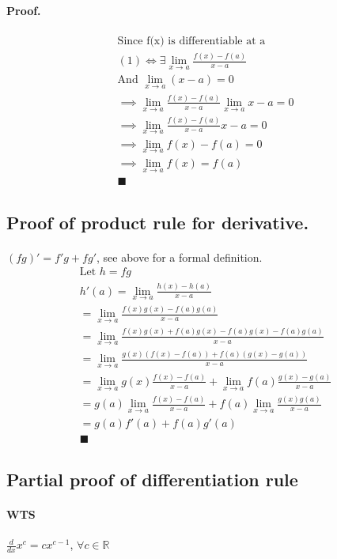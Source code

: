 \documentclass{article}
\begin{document}
	\paragraph{Proof.}
	\begin{align*}
		\text{Since f(x) is differentiable at a} \\
		(1) \iff \exists \lim_{x \to a}\frac{f(x) - f(a)}{x - a} \\
		\text{And } \lim_{x \to a}({x - a}) = 0\\
		\implies \lim_{x \to a}\frac{f(x) - f(a)}{x - a} \lim_{x \to a}{x - a} = 0 \\
		\implies \lim_{x \to a}{\frac{f(x) - f(a)}{x - a} {x - a}} = 0 \\
		\implies \lim_{x \to a}{f(x) - f(a)} = 0 \\
		\implies \lim_{x \to a}f(x) = f(a)\\
		\blacksquare
	\end{align*}
	\subsection{Proof of product rule for derivative.}
	\paragraph{} $(fg)' = f'g + fg'$, see above for a formal definition.
	\begin{align*}
		\text{Let } h = fg \\
		h'(a) = \lim_{x \to a}\frac{h(x) - h(a)}{x-a} \\
		= \lim_{x \to a}\frac{f(x)g(x) - f(a)g(a)}{x-a} \\
		= \lim_{x \to a}\frac{f(x)g(x) + f(a)g(x) - f(a)g(x) - f(a)g(a)}{x-a} \\
		= \lim_{x \to a}\frac{g(x)(f(x) - f(a)) + f(a)(g(x) -g(a))}{x-a} \\
		= \lim_{x \to a}g(x)\frac{f(x) - f(a)}{x-a} + \lim_{x \to a}f(a)\frac{g(x) - g(a)}{x-a} \\
		= g(a) \lim_{x \to a} \frac{f(x) - f(a)}{x-a} + f(a) \lim_{x \to a}\frac{g(x) g(a)}{x-a} \\
		= g(a)f'(a) + f(a)g'(a) \\
		\blacksquare
	\end{align*}
	\subsection{Partial proof of differentiation rule}
	\paragraph{WTS}$\frac{d}{dx}x^c = cx^{c-1}$, $\forall c \in \mathbb{R}$
\end{document}
